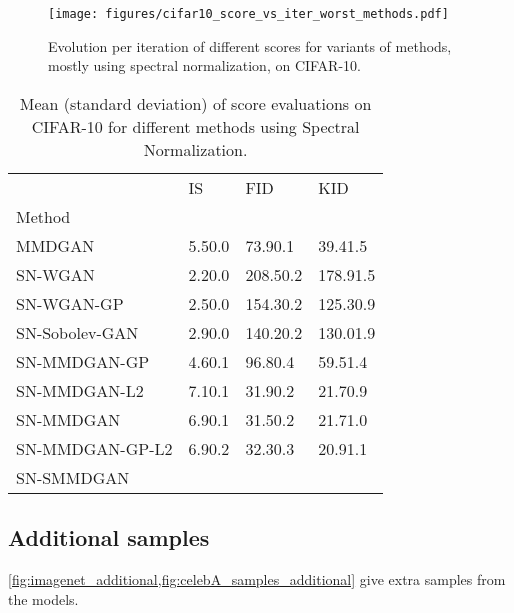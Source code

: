 \documentclass{article}
\begin{document}
\begin{figure}[ht]
        \centering
        \texttt{[image: figures/cifar10\_score\_vs\_iter\_worst\_methods.pdf]}

        \caption{Evolution per iteration of different scores for variants of methods, mostly using spectral normalization, on CIFAR-10.}
       \label{fig:score_per_iter_cifar10_sn}
\end{figure}



\begin{table}[ht]
    \centering
 \caption{Mean (standard deviation) of score evaluations on CIFAR-10 for different methods using Spectral Normalization.}
    \label{tab:sn_cifar10_scores}
  \begin{tabular}{llll}
\toprule
{} &                                    IS &                                    FID &                       KID \\
Method          &                                       &                                        &                                        \\
\midrule
MMDGAN          &             5.50.0 &             73.90.1 &             39.41.5 \\
SN-WGAN         &             2.20.0 &            208.50.2 &            178.91.5 \\
SN-WGAN-GP      &             2.50.0 &            154.30.2 &            125.30.9 \\
SN-Sobolev-GAN  &             2.90.0 &            140.20.2 &            130.01.9 \\
SN-MMDGAN-GP    &             4.60.1 &             96.80.4 &             59.51.4 \\
SN-MMDGAN-L2    &             7.10.1 &             31.90.2 &             21.70.9 \\
SN-MMDGAN       &             6.90.1 &             31.50.2 &             21.71.0 \\
SN-MMDGAN-GP-L2 &             6.90.2 &             32.30.3 &             20.91.1 \\
SN-SMMDGAN      &  \mathsmaller{\pm} &  \mathsmaller{\pm} &  \mathsmaller{\pm} \\
\bottomrule
\end{tabular}
 \end{table}



\subsection{Additional samples} \label{appendix:additional-samples}
\cref{fig:imagenet_additional,fig:celebA_samples_additional} give extra samples from the models.
\end{document}
